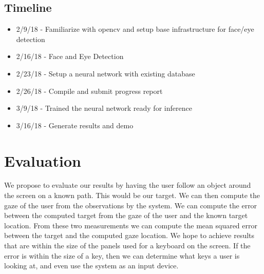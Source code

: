 \documentclass[10pt,twocolumn,letterpaper]{article}
\begin{document}
\subsection{Timeline}
\begin{itemize}
  \item 2/9/18 - Familiarize with opencv and setup base infrastructure for face/eye detection
  \item 2/16/18 - Face and Eye Detection
  \item 2/23/18 - Setup a neural network with existing database
  \item 2/26/18 - Compile and submit progress report
  \item 3/9/18 - Trained the neural network ready for inference 
  \item 3/16/18 - Generate results and demo
\end{itemize}

\section{Evaluation}
We propose to evaluate our results by having the user follow an object
around the screen on a known path. This would be our target. We can
then compute the gaze of the user from the observations by the
system. We can compute the error between the computed target from the
gaze of the user and the known target location. From these two
measurements we can compute the mean squared error between the target
and the computed gaze location. We hope to achieve results that are
within the size of the panels used for a keyboard on the screen. If
the error is within the size of a key, then we can determine what keys
a user is looking at, and even use the system as an input device.
\end{document}
